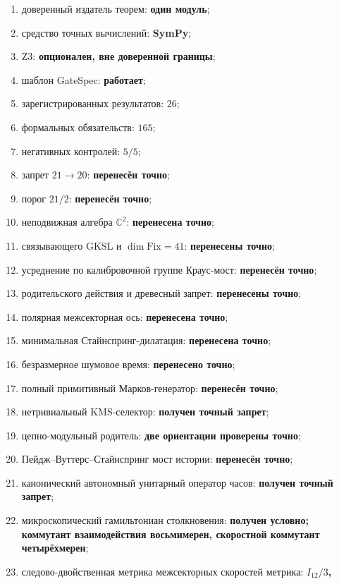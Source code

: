 \begin{protocol}
\begin{enumerate}
 \item доверенный издатель теорем: \textbf{один модуль};
 \item средство точных вычислений: \textbf{SymPy};
 \item Z3: \textbf{опционален, вне доверенной границы};
 \item шаблон GateSpec: \textbf{работает};
 \item зарегистрированных результатов: \textbf{$26$};
 \item формальных обязательств: \textbf{$165$};
 \item негативных контролей: \textbf{$5/5$};
 \item запрет $21\to20$: \textbf{перенесён точно};
 \item порог $21/2$: \textbf{перенесён точно};
 \item неподвижная алгебра $\mathbb C^2$: \textbf{перенесена точно};
 \item связывающего GKSL и $\dim\mathrm{Fix}=41$: \textbf{перенесены точно};
 \item усреднение по калибровочной группе Краус-мост: \textbf{перенесён точно};
 \item родительского действия и древесный запрет: \textbf{перенесены точно};
 \item полярная межсекторная ось: \textbf{перенесена точно};
 \item минимальная Стайнспринг-дилатация: \textbf{перенесена точно};
 \item безразмерное шумовое время: \textbf{перенесено точно};
 \item полный примитивный Марков-генератор: \textbf{перенесён точно};
 \item нетривиальный KMS-селектор: \textbf{получен точный запрет};
 \item цепно-модульный родитель: \textbf{две ориентации проверены точно};
 \item Пейдж--Вуттерс--Стайнспринг мост истории: \textbf{перенесён точно};
 \item канонический автономный унитарный оператор часов: \textbf{получен точный запрет};
 \item микроскопический гамильтониан столкновения: \textbf{получен условно;
       коммутант взаимодействия восьмимерен, скоростной коммутант четырёхмерен};
 \item следово-двойственная метрика межсекторных скоростей метрика: \textbf{$I_{12}/3$,
}
\end{enumerate}
\end{protocol}
